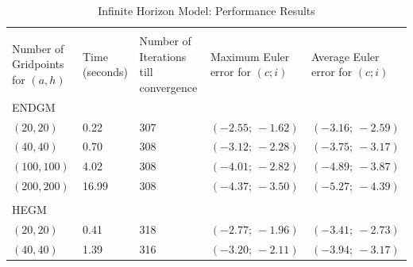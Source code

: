 \documentclass[a4paper,12pt]{article}%
\begin{document}
\begin{table}[htb] \centering
\caption{Infinite Horizon Model: Performance Results}%
\begin{tabular}
[c]{p{2cm}p{2cm}p{2cm}p{3cm}p{3cm}}%
\multicolumn{1}{c}{} & \multicolumn{1}{c}{} & \multicolumn{1}{c}{} &
\multicolumn{1}{c}{} & \multicolumn{1}{c}{}\\
Number of Gridpoints for $(a,h)$ & \multicolumn{1}{||p{2cm}}{Time (seconds)} &
\multicolumn{1}{|p{2cm}}{Number of Iterations till convergence} &
\multicolumn{1}{|p{3cm}}{Maximum Euler error for $\left(  c;i\right)  $} &
\multicolumn{1}{|p{3cm}}{Average Euler error for $\left(  c;i\right)  $%
}\\\hline
ENDGM & \multicolumn{1}{||p{2cm}}{} & \multicolumn{1}{|p{2cm}}{} &
\multicolumn{1}{|p{3cm}}{} & \multicolumn{1}{|p{3cm}}{}\\
$\left(  20,20\right)  $ & \multicolumn{1}{||p{2cm}}{0.22} &
\multicolumn{1}{|p{2cm}}{307} & \multicolumn{1}{|p{3cm}}{$(-2.55;\ -1.62)$} &
\multicolumn{1}{|p{3cm}}{$(-3.16;\ -2.59)$}\\
$\left(  40,40\right)  $ & \multicolumn{1}{||p{2cm}}{0.70} &
\multicolumn{1}{|p{2cm}}{308} & \multicolumn{1}{|p{3cm}}{$(-3.12;\ -2.28)$} &
\multicolumn{1}{|p{3cm}}{$(-3.75;\ -3.17)$}\\
$\left(  100,100\right)  $ & \multicolumn{1}{||p{2cm}}{4.02} &
\multicolumn{1}{|p{2cm}}{308} & \multicolumn{1}{|p{3cm}}{$(-4.01;\ -2.82)$} &
\multicolumn{1}{|p{3cm}}{$(-4.89;\ -3.87)$}\\
$\left(  200,200\right)  $ & \multicolumn{1}{||p{2cm}}{16.99} &
\multicolumn{1}{|p{2cm}}{308} & \multicolumn{1}{|p{3cm}}{$(-4.37;\ -3.50)$} &
\multicolumn{1}{|p{3cm}}{$(-5.27;\ -4.39)$}\\
& \multicolumn{1}{||p{2cm}}{} &  &  & \\\hline
HEGM & \multicolumn{1}{||p{2cm}}{} & \multicolumn{1}{|p{2cm}}{} &
\multicolumn{1}{|p{3cm}}{} & \multicolumn{1}{|p{3cm}}{}\\
$\left(  20,20\right)  $ & \multicolumn{1}{||p{2cm}}{0.41} &
\multicolumn{1}{|p{2cm}}{318} & \multicolumn{1}{|p{3cm}}{$(-2.77;\ -1.96)$} &
\multicolumn{1}{|p{3cm}}{$(-3.41;\ -2.73)$}\\
$\left(  40,40\right)  $ & \multicolumn{1}{||p{2cm}}{1.39} &
\multicolumn{1}{|p{2cm}}{316} & \multicolumn{1}{|p{3cm}}{$(-3.20;\ -2.11)$} &
\multicolumn{1}{|p{3cm}}{$(-3.94;\ -3.17)$}\\

\end{tabular}
\end{table}
\end{document}
